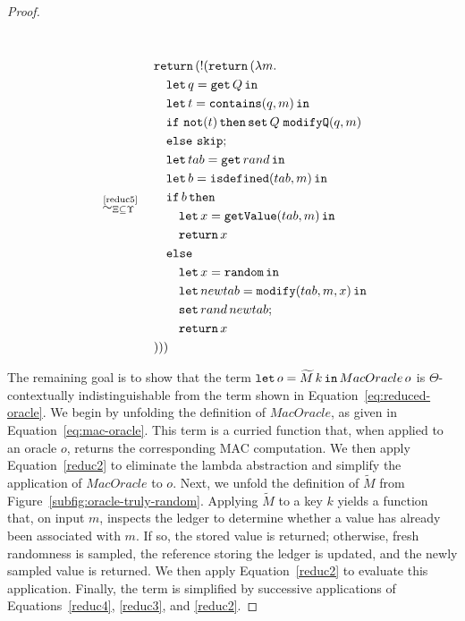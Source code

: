 \begin{proof}
{\begin{align}
    \\[2ex]
    &\quad\overset{\text{~\ref{reduc5}}}{\sim_{\Xi\subseteq\Upsilon}}\quad
    \begin{aligned}
        &\mathtt{return}\,(\mathord{!}(\mathtt{return}\,(\lambda m. \\
        &\quad \mathtt{let}\,q=\mathtt{get}\, Q\,\mathtt{in}\, \\
        &\quad \mathtt{let}\,t=\mathtt{contains}(q,m)\,\mathtt{in}\, \\
        &\quad \mathtt{if}\ \mathtt{not}(t)\,\mathtt{then}\, \mathtt{set}\,Q\;\mathtt{modifyQ}(q,m)\\
        &\quad \mathtt{else}\ \mathtt{skip}; \\
        &\quad\mathtt{let}\,tab = \mathtt{get}\,rand\,\mathtt{in}\, \\
        &\quad\mathtt{let}\,b = \mathtt{isdefined}(tab, m)\,\mathtt{in}\, \\
        &\quad\mathtt{if}\, b\, \mathtt{then} \\
        &\quad\quad \mathtt{let}\,x = \mathtt{getValue}(tab, m)\,\mathtt{in}\, \\
        &\quad\quad \mathtt{return}\, x \\
        &\quad\mathtt{else} \\
        &\quad\quad \mathtt{let}\,x = \mathtt{random}\,\mathtt{in}\, \\
        &\quad\quad \mathtt{let}\,newtab = \mathtt{modify}(tab, m, x)\,\mathtt{in}\, \\
        &\quad\quad \mathtt{set}\,rand\,newtab; \\
        &\quad\quad \mathtt{return}\, x \\
        &)))
    \end{aligned} \label{eq:reduced-oracle}
\end{align}
}

The remaining goal is to show that the term $\mathtt{let}\,o=\widetilde{M}\,k\,\mathtt{in}\, MacOracle\,o$ is $\Theta$-contextually indistinguishable from the term shown in Equation~\ref{eq:reduced-oracle}. We begin by unfolding the definition of $\mathit{MacOracle}$, as given in Equation~\ref{eq:mac-oracle}. This term is a curried function that, when applied to an oracle $o$, returns the corresponding MAC computation. We then apply Equation~\ref{reduc2} to eliminate the lambda abstraction and simplify the application of $\mathit{MacOracle}$ to $o$. Next, we unfold the definition of $\widetilde{M}$ from Figure~\ref{subfig:oracle-truly-random}. Applying $\widetilde{M}$ to a key $k$ yields a function that, on input $m$, inspects the ledger to determine whether a value has already been associated with $m$. If so, the stored value is returned; otherwise, fresh randomness is sampled, the reference storing the ledger is updated, and the newly sampled value is returned. We then apply Equation~\ref{reduc2} to evaluate this application. Finally, the term is simplified by successive applications of Equations~\ref{reduc4}, \ref{reduc3}, and \ref{reduc2}.


\end{proof}
